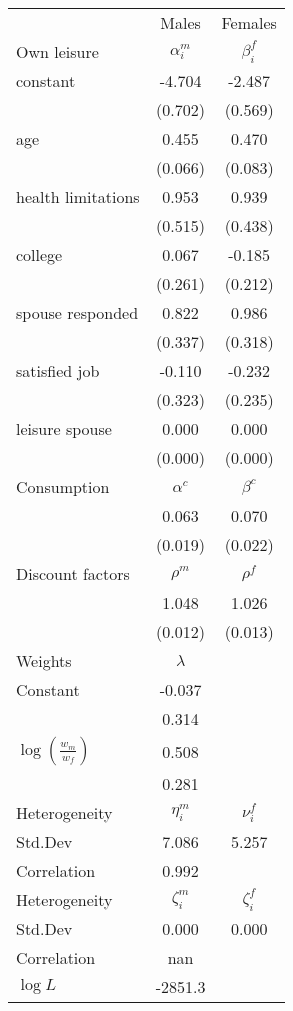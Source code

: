 \begin{tabular}{lcc} 
\hline\hline 
 & Males & Females \\ 
Own leisure & $\alpha_{i}^{m}$ & $\beta_{i}^{f}$ \\ 
constant & -4.704 & -2.487 \\ 
 & (0.702) & (0.569) \\ 
age & 0.455 & 0.470 \\ 
 & (0.066) & (0.083) \\ 
health limitations & 0.953 & 0.939 \\ 
 & (0.515) & (0.438) \\ 
college & 0.067 & -0.185 \\ 
 & (0.261) & (0.212) \\ 
spouse responded & 0.822 & 0.986 \\ 
 & (0.337) & (0.318) \\ 
satisfied job & -0.110 & -0.232 \\ 
 & (0.323) & (0.235) \\ 
leisure spouse & 0.000 & 0.000 \\ 
 & (0.000) & (0.000) \\ 
Consumption & $\alpha^{c}$ & $\beta^{c}$ \\ 
 & 0.063 & 0.070 \\ 
 & (0.019) & (0.022) \\ 
Discount factors & $\rho^m$ & $\rho^f$ \\ 
 & 1.048 & 1.026 \\ 
 & (0.012) & (0.013) \\ 
Weights & $\lambda$ &  \\ 
Constant & -0.037 &  \\ 
 & 0.314 &  \\ 
$\log(\frac{w_m}{w_f})$ & 0.508 &  \\ 
 & 0.281 &  \\ 
Heterogeneity & $\eta_i^m$ & $\nu_i^f$ \\ 
Std.Dev & 7.086 & 5.257 \\ 
Correlation & 0.992 &  \\ 
Heterogeneity & $\zeta_i^m$ & $\zeta_i^f$ \\ 
Std.Dev & 0.000 & 0.000 \\ 
Correlation & nan &  \\ 
\hline 
$\log L$ & -2851.3 & \\ 
\hline \hline 
\end{tabular} 
